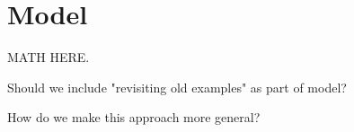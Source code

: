 \section{Model}
\label{sec:model}

MATH HERE.

Should we include "revisiting old examples" as part of model?

How do we make this approach more general?


